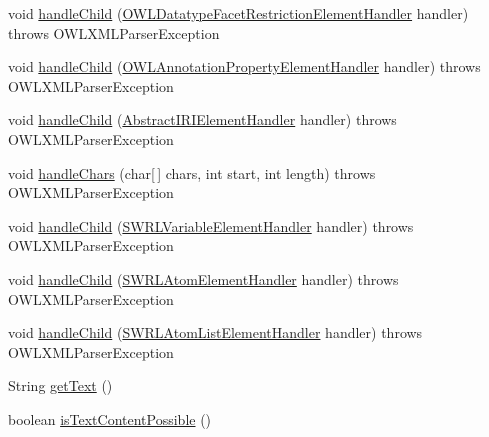 \begin{DoxyCompactItemize}
\item 
void \hyperlink{interfaceorg_1_1coode_1_1owlapi_1_1owlxmlparser_1_1_o_w_l_element_handler_3_01_o_01_4_a1e561a773fb0c31af6e8537eafcf98e8}{handle\-Child} (\hyperlink{classorg_1_1coode_1_1owlapi_1_1owlxmlparser_1_1_o_w_l_datatype_facet_restriction_element_handler}{O\-W\-L\-Datatype\-Facet\-Restriction\-Element\-Handler} handler)  throws O\-W\-L\-X\-M\-L\-Parser\-Exception
\item 
void \hyperlink{interfaceorg_1_1coode_1_1owlapi_1_1owlxmlparser_1_1_o_w_l_element_handler_3_01_o_01_4_ab631172d32917b921c137b7f6b21c5c1}{handle\-Child} (\hyperlink{classorg_1_1coode_1_1owlapi_1_1owlxmlparser_1_1_o_w_l_annotation_property_element_handler}{O\-W\-L\-Annotation\-Property\-Element\-Handler} handler)  throws O\-W\-L\-X\-M\-L\-Parser\-Exception
\item 
void \hyperlink{interfaceorg_1_1coode_1_1owlapi_1_1owlxmlparser_1_1_o_w_l_element_handler_3_01_o_01_4_a1701169ace92647f59d7fe2f7753ce67}{handle\-Child} (\hyperlink{classorg_1_1coode_1_1owlapi_1_1owlxmlparser_1_1_abstract_i_r_i_element_handler}{Abstract\-I\-R\-I\-Element\-Handler} handler)  throws O\-W\-L\-X\-M\-L\-Parser\-Exception
\item 
void \hyperlink{interfaceorg_1_1coode_1_1owlapi_1_1owlxmlparser_1_1_o_w_l_element_handler_3_01_o_01_4_a377a7d5a24faf761d05a0a3dd95fd6fc}{handle\-Chars} (char\mbox{[}$\,$\mbox{]} chars, int start, int length)  throws O\-W\-L\-X\-M\-L\-Parser\-Exception
\item 
void \hyperlink{interfaceorg_1_1coode_1_1owlapi_1_1owlxmlparser_1_1_o_w_l_element_handler_3_01_o_01_4_a47e97750d70e3ee5886dd3bf9a3118d4}{handle\-Child} (\hyperlink{classorg_1_1coode_1_1owlapi_1_1owlxmlparser_1_1_s_w_r_l_variable_element_handler}{S\-W\-R\-L\-Variable\-Element\-Handler} handler)  throws O\-W\-L\-X\-M\-L\-Parser\-Exception
\item 
void \hyperlink{interfaceorg_1_1coode_1_1owlapi_1_1owlxmlparser_1_1_o_w_l_element_handler_3_01_o_01_4_a011db184131d5381b5d3d42ff73b7b46}{handle\-Child} (\hyperlink{classorg_1_1coode_1_1owlapi_1_1owlxmlparser_1_1_s_w_r_l_atom_element_handler}{S\-W\-R\-L\-Atom\-Element\-Handler} handler)  throws O\-W\-L\-X\-M\-L\-Parser\-Exception
\item 
void \hyperlink{interfaceorg_1_1coode_1_1owlapi_1_1owlxmlparser_1_1_o_w_l_element_handler_3_01_o_01_4_a8bb82ad5ee3fee85e8e5dbc04ac7af05}{handle\-Child} (\hyperlink{classorg_1_1coode_1_1owlapi_1_1owlxmlparser_1_1_s_w_r_l_atom_list_element_handler}{S\-W\-R\-L\-Atom\-List\-Element\-Handler} handler)  throws O\-W\-L\-X\-M\-L\-Parser\-Exception
\item 
String \hyperlink{interfaceorg_1_1coode_1_1owlapi_1_1owlxmlparser_1_1_o_w_l_element_handler_3_01_o_01_4_a62a5fd0e073eb6887d98254abc65f4f6}{get\-Text} ()
\item 
boolean \hyperlink{interfaceorg_1_1coode_1_1owlapi_1_1owlxmlparser_1_1_o_w_l_element_handler_3_01_o_01_4_ae145864c0fcc8777458fed5202f147c9}{is\-Text\-Content\-Possible} ()
\end{DoxyCompactItemize}


